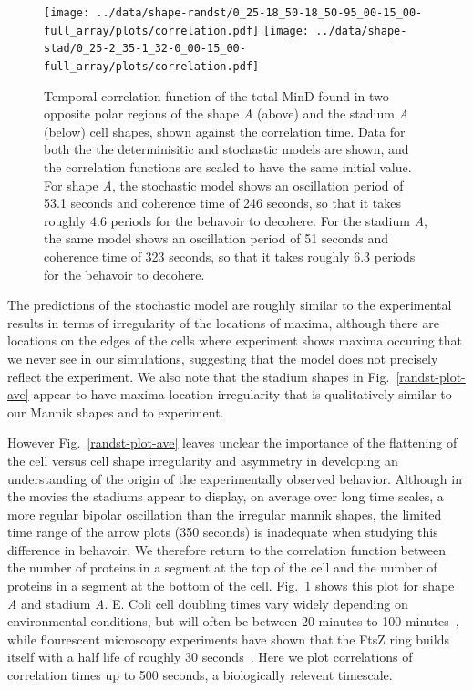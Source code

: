 \documentclass[letterpaper,twocolumn,amsmath,amssymb,pre]{revtex4-1}
\begin{document}
\begin{figure}
  \texttt{[image: ../data/shape-randst/0\_25-18\_50-18\_50-95\_00-15\_00-full\_array/plots/correlation.pdf]}
  \texttt{[image: ../data/shape-stad/0\_25-2\_35-1\_32-0\_00-15\_00-full\_array/plots/correlation.pdf]}
  \caption{Temporal correlation function of the total MinD found in
    two opposite polar regions of the shape \emph{A} (above) and the
    stadium \emph{A} (below) cell shapes, shown against the
    correlation time.  Data for both the the determinisitic and
    stochastic models are shown, and the correlation functions are
    scaled to have the same initial value.  For shape \emph{A}, the
    stochastic model shows an oscillation period of 53.1 seconds and
    coherence time of 246 seconds, so that it takes roughly 4.6 periods
    for the behavoir to decohere.  For the stadium \emph{A}, the same
    model shows an oscillation period of 51 seconds and coherence time of
    323 seconds, so that it takes roughly 6.3 periods for the behavoir
    to decohere.}
  \label{fig:corr-pancake-A}
\end{figure}

The predictions of the stochastic model are roughly similar to the
experimental results in terms of irregularity of the locations of
maxima, although there are locations on the edges of the cells where
experiment shows maxima occuring that we never see in our simulations,
suggesting that the model does not precisely reflect the experiment.
We also note that the stadium shapes in Fig.~\ref{randst-plot-ave}
appear to have maxima location irregularity that is qualitatively
similar to our Mannik shapes and to experiment.

However Fig.~\ref{randst-plot-ave} leaves unclear the importance of
the flattening of the cell versus cell shape irregularity and
asymmetry in developing an understanding of the origin of the
experimentally observed behavior.  Although in the movies the stadiums
appear to display, on average over long time scales, a more regular
bipolar oscillation than the irregular mannik shapes, the limited time
range of the arrow plots (350 seconds) is inadequate when studying
this difference in behavoir.  We therefore return to the correlation
function between the number of proteins in a segment at the top of the
cell and the number of proteins in a segment at the bottom of the
cell.  Fig.~\ref{fig:corr-pancake-A} shows this plot for shape
\emph{A} and stadium \emph{A}.  E. Coli cell doubling times vary
widely depending on environmental conditions, but will often be
between 20 minutes to 100 minutes~\cite{pierucci1972chromosome}, while
flourescent microscopy experiments have shown that the FtsZ ring
builds itself with a half life of roughly 30
seconds~\cite{stricker2002rapid}.  Here we plot correlations of
correlation times up to 500 seconds, a biologically relevent
timescale.
\end{document}
